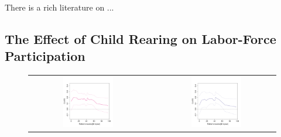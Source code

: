 \documentclass[aos]{imsart}
\theoremstyle{plain}
\theoremstyle{definition}
\theoremstyle{remark}
\newcommand{\FIGW}{0.45}
\begin{document}
\begin{CJK}{UTF8}{gbsn}
There is a rich literature on ...

\subsection{The Effect of Child Rearing on Labor-Force Participation}
\label{sec:angrist_evans}

\begin{figure}
\centering
\begin{tabular}{ccc}
\includegraphics[width=\FIGW\textwidth]{familysize_18.pdf} & &
\includegraphics[width=\FIGW\textwidth]{familysize_22.pdf} \\

\end{tabular}
\end{figure}
\end{CJK}
\end{document}
